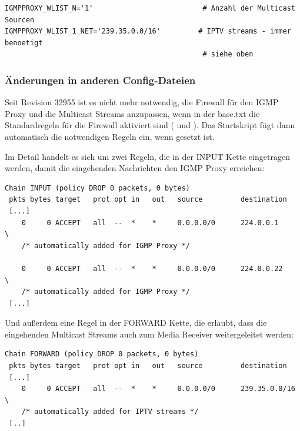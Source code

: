 \begin{description}
\begin{example}
\begin{verbatim}
IGMPPROXY_WLIST_N='1'                          # Anzahl der Multicast Sourcen
IGMPPROXY_WLIST_1_NET='239.35.0.0/16'         # IPTV streams - immer benoetigt
                                               # siehe oben
\end{verbatim}
\end{example}

\end{description}

\subsubsection{Änderungen in anderen Config-Dateien}

Seit Revision 32955 ist es nicht mehr notwendig, die Firewall für den IGMP Proxy
und die Multicast Streams anzupassen, wenn in der base.txt die  Standardregeln
für die Firewall aktiviert sind ( und
). Das Startskript fügt dann automatisch
die notwendigen Regeln ein, wenn  gesetzt ist.

Im Detail handelt es sich um zwei Regeln, die in der INPUT Kette eingetragen
werden, damit die eingehenden Nachrichten den IGMP Proxy erreichen:

\begin{example}
\begin{verbatim}
Chain INPUT (policy DROP 0 packets, 0 bytes)
 pkts bytes target   prot opt in   out   source         destination
 [...]
    0     0 ACCEPT   all  --  *    *     0.0.0.0/0      224.0.0.1     \
    /* automatically added for IGMP Proxy */

    0     0 ACCEPT   all  --  *    *     0.0.0.0/0      224.0.0.22    \
    /* automatically added for IGMP Proxy */
 [...]
\end{verbatim}
\end{example}

Und außerdem eine Regel in der FORWARD Kette, die erlaubt, dass die eingehenden
Multicast Streams auch zum Media Receiver weitergeleitet werden:

\begin{example}
\begin{verbatim}
Chain FORWARD (policy DROP 0 packets, 0 bytes)
 pkts bytes target   prot opt in   out   source         destination
 [...]
    0     0 ACCEPT   all  --  *    *     0.0.0.0/0      239.35.0.0/16  \
    /* automatically added for IPTV streams */
 [..]
\end{verbatim}
\end{example}

